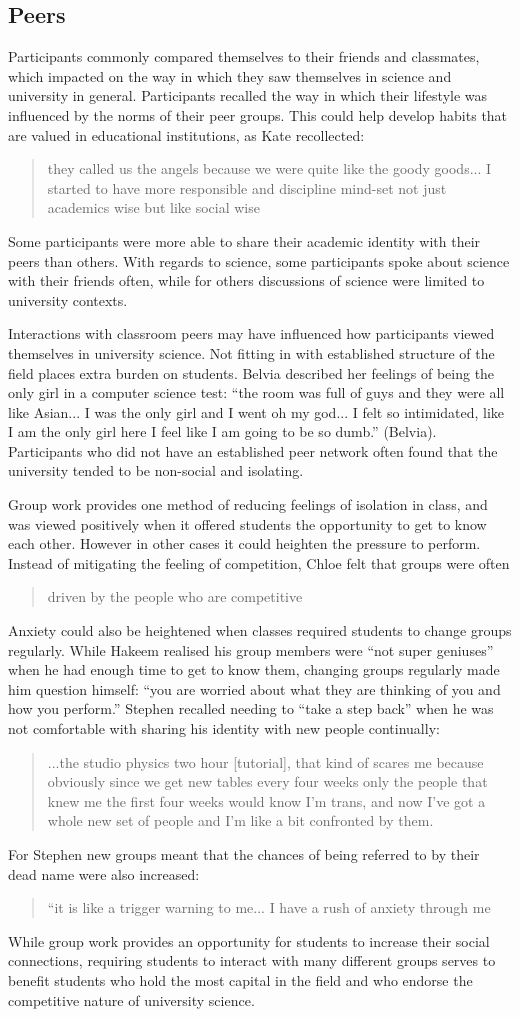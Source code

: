 \subsection{Peers}
Participants commonly compared themselves to their friends and classmates, which impacted on the way in which they saw themselves in science and university in general. Participants recalled the way in which their lifestyle was influenced by the norms of their peer groups. This could help develop habits that are valued in educational institutions, as Kate recollected: \blockquote{they called us the angels because we were quite like the goody goods... I started to have more responsible and discipline mind-set not just academics wise but like social wise}. Some participants were more able to share their academic identity with their peers than others. With regards to science, some participants spoke about science with their friends often, while for others discussions of science were limited to university contexts.


Interactions with classroom peers may have influenced how participants viewed themselves in university science. Not fitting in with established structure of the field places extra burden on students. Belvia described her feelings of being the only girl in a computer science test: ``the room was full of guys and they were all like Asian... I was the only girl and I went oh my god... I felt so intimidated, like I am the only girl here I feel like I am going to be so dumb.'' (Belvia). Participants who did not have an established peer network often found that the university tended to be non-social and isolating.

Group work provides one method of reducing feelings of isolation in class, and was viewed positively when it offered students the opportunity to get to know each other. However in other cases it could heighten the pressure to perform. Instead of mitigating the feeling of competition, Chloe felt that groups were often \blockquote{driven by the people who are competitive}. Anxiety could also be heightened when classes required students to change groups regularly. While Hakeem realised his group members were ``not super geniuses'' when he had enough time to get to know them, changing groups regularly made him question himself: ``you are worried about what they are thinking of you and how you perform.'' Stephen recalled needing to ``take a step back'' when he was not comfortable with sharing his identity with new people continually: \blockquote{...the studio physics two hour [tutorial], that kind of scares me because obviously since we get new tables every four weeks only the people that knew me the first four weeks would know I'm trans, and now I've got a whole new set of people and I’m like a bit confronted by them.} For Stephen new groups meant that the chances of being referred to by their dead name were also increased: \blockquote{``it is like a trigger warning to me... I have a rush of anxiety through me} While group work provides an opportunity for students to increase their social connections, requiring students to interact with many different groups serves to benefit students who hold the most capital in the field and who endorse the competitive nature of university science. 

